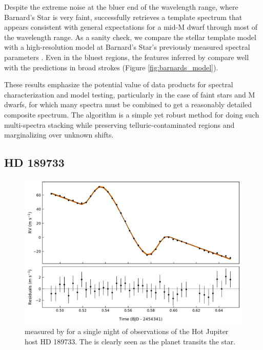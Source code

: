 \documentclass[modern]{aastex62}
\newcommand{\Mdwarf}{Barnard's Star\xspace} %
\begin{document}
Despite the extreme noise at the bluer end of the wavelength range, where \Mdwarf is very faint, \wobble successfully retrieves a template spectrum that appears consistent with general expectations for a mid-M dwarf through most of the \HARPS wavelength range.
As a sanity check, we compare the \wobble stellar template model with a high-resolution \PHOENIX model at \Mdwarf's previously measured spectral parameters \citep[\teff = 3200 K, \logg = 5.0, and \mh = $-0.5$;][and references therein]{Husser2013, Artigau2018}.
Even in the bluest regions, the features inferred by \wobble compare well with the \PHOENIX predictions in broad strokes (Figure \ref{fig:barnards_model}).

These results emphasize the potential value of \wobble data products for spectral characterization and model testing, particularly in the case of faint stars and M dwarfs, for which many spectra must be combined to get a reasonably detailed composite spectrum.
The \wobble algorithm is a simple yet robust method for doing such multi-spectra stacking while preserving telluric-contaminated regions and marginalizing over unknown \RV shifts.

\subsection{HD 189733}

\begin{figure}
\centering
\includegraphics[width=5in]{hd189_rm}
\caption{\RVs measured by \wobble for a single night of observations of the Hot Jupiter host HD 189733. The \RM is clearly seen as the planet transits the star. }
\label{fig:hd189_rm}
\end{figure}
\end{document}
